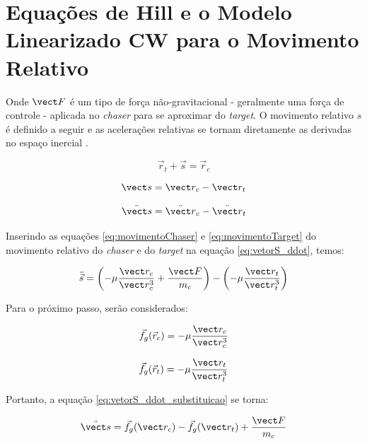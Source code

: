 \section{Equações de Hill e o Modelo Linearizado CW para o Movimento Relativo}

Onde $\vect F$ é um tipo de força não-gravitacional - geralmente uma força de controle - aplicada no \emph{chaser} para se aproximar do \emph{target}. O movimento relativo $s$ é definido a seguir e as acelerações relativas se tornam diretamente as derivadas no espaço inercial \cite{fehse2003}.

\begin{equation}
\vec r_t + \vec s = \vec r_c
\end{equation}

\begin{equation}
\label{eq:vetorS}
\vect s = \vect r_{c} - \vect r_{t}
\end{equation}

\begin{equation}
\label{eq:vetorS_ddot}
\ddot{\vect s} = \ddot{\vect r}_{c} - \ddot{\vect r}_{t}
\end{equation}

Inserindo as equações \eqref{eq:movimentoChaser} e \eqref{eq:movimentoTarget} do movimento relativo do \emph{chaser} e do \emph{target} na equação \eqref{eq:vetorS_ddot}, temos:

\begin{equation}
\label{eq:vetorS_ddot_substituicao}
\ddot{\vec s} = \left(-\mu \frac{\vect r_c}{\vect r_{c}^3} + \frac{\vect F}{m_c}\right) - \left(-\mu \frac{\vect r_t}{\vect r_t^3}\right)
\end{equation}

Para o próximo passo, serão considerados:

\begin{equation}
    \label{eq:fg_rc}
\vec f_g(\vec r_c) = -\mu \frac{\vect r_c}{\vect r_{c}^3}
\end{equation}

\begin{equation}
    \label{eq:fg_rt}
\vec f_g(\vec r_t) = -\mu \frac{\vect r_t}{\vect r_{t}^3}
\end{equation}

Portanto, a equação \eqref{eq:vetorS_ddot_substituicao} se torna:

\begin{equation}
\label{eq:fg_rc_fg_rt}
\ddot{\vect s} = \vec f_g(\vect r_c) - \vec f_g(\vect r_t) + \frac{\vect F}{m_c}
\end{equation}

